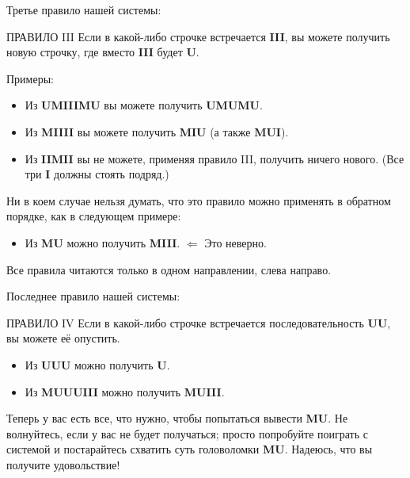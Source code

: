 \documentclass[../main.tex]{subfiles}
\begin{document}
Третье правило нашей системы:

\begin{mybox}{ПРАВИЛО III}
    Если в какой-либо строчке встречается \textbf{III}, вы можете получить новую строчку, где вместо \textbf{III} будет \textbf{U}.
\end{mybox}

Примеры:

\begin{itemize}[label={}, noitemsep, topsep=6pt, leftmargin=\parindent]
    \item Из \textbf{UMIIIMU} вы можете получить \textbf{UMUMU}.
    \item Из \textbf{MIIII} вы можете получить \textbf{MIU} (а также \textbf{MUI}).
    \item Из \textbf{IIMII} вы не можете, применяя правило III, получить ничего нового. (Все три \textbf{I} должны стоять подряд.)
\end{itemize}

Ни в коем случае нельзя думать, что это правило можно применять в обратном порядке, как в следующем примере:

\begin{itemize}[label={}, noitemsep, topsep=6pt, leftmargin=\parindent]
    \item Из \textbf{MU} можно получить \textbf{MIII}. $\Leftarrow$ Это неверно.
\end{itemize}

Все правила читаются только в одном направлении, слева направо.

Последнее правило нашей системы:

\begin{mybox}{ПРАВИЛО IV}
    Если в какой-либо строчке встречается последовательность \textbf{UU}, вы можете её опустить.
\end{mybox}

\begin{itemize}[label={}, noitemsep, topsep=6pt, leftmargin=\parindent]
    \item Из \textbf{UUU} можно получить \textbf{U}.
    \item Из \textbf{MUUUIII} можно получить \textbf{MUIII}.
\end{itemize}

Теперь у вас есть все, что нужно, чтобы попытаться вывести \textbf{MU}.
Не волнуйтесь, если у вас не будет получаться; просто попробуйте поиграть с системой и постарайтесь схватить суть головоломки \textbf{MU}.
Надеюсь, что вы получите удовольствие!
\end{document}
